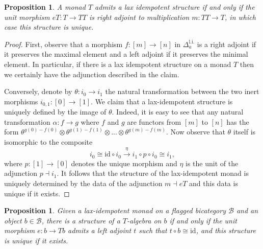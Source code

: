 \documentclass[a4paper, reqno]{amsart}
\newtheorem{prop}[theorem]{Proposition}
\theoremstyle{definition}
\newcommand\cB{\mathscr B}
\newcommand\id{\mathrm{id}}
\newcommand\li{\mathrm{l.i.}}
\begin{document}
\begin{prop}
A monad $T$ admits a lax idempotent structure if and only if the unit morphism $eT:T\rightarrow TT$ is right adjoint to multiplication $m:TT\rightarrow T$, in which case this structure is unique.
\end{prop}
\begin{proof}
First, observe that a morphism $f:[m]\rightarrow[n]$ in $\Delta^\li_a$ is a right adjoint if it preserves the maximal element and a left adjoint if it preserves the minimal element. In particular, if there is a lax idempotent structure on a monad $T$ then we certainly have the adjunction described in the claim.\par
Conversely, denote by $\theta:i_0\rightarrow i_1$ the natural transformation between the two inert morphisms $i_{0,1}:[0]\rightarrow[1]$. We claim that a lax-idempotent structure is uniquely defined by the image of $\theta$. Indeed, it is easy to see that any natural transformation $\alpha:f\rightarrow g$ where $f$ and $g$ are functors from $[m]$ to $[n]$ has the form $\theta^{g(0)-f(0)}\otimes\theta^{g(1)-f(1)}\otimes...\otimes\theta^{g(m)-f(m)}$. Now observe that $\theta$ itself is isomorphic to the composite
\[i_0\cong\id\circ i_0\xrightarrow{\eta}i_1\circ p\circ i_0\cong i_1,\]
where $p:[1]\rightarrow[0]$ denotes the unique morphism and $\eta$ is the unit of the adjunction $p\dashv i_1$. It follows that the structure of the lax-idempotent monad is uniquely determined by the data of the adjunction $m\dashv eT$ and this data is unique if it exists.
\end{proof}
\begin{prop}\label{prop:lax_uniq}
Given a lax-idempotent monad on a flagged bicategory $\cB$ and an object $b\in\cB$, there is a structure of a $T$-algebra on $b$ if and only if the unit morphism $e:b\rightarrow Tb$ admits a left adjoint $t$ such that $t\circ b\cong\id$, and this structure is unique if it exists.
\end{prop}
\end{document}
